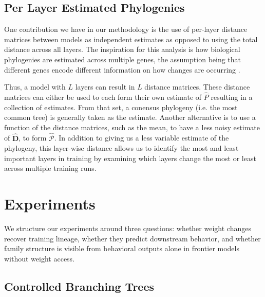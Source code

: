 \documentclass{article}
\begin{document}
\subsection{Per Layer Estimated Phylogenies}
\label{sec:framework:layers}

One contribution we have in our methodology is the use of per-layer distance matrices between models as independent estimates as opposed to using the total distance across all layers.  The inspiration for this analysis is how biological phylogenies are estimated across multiple genes, the assumption being that different genes encode different information on how changes are occurring \cite{}.

Thus, a model with $L$ layers can result in $L$ distance matrices.  These distance matrices can either be used to each form their own estimate of $\hat{P}$ resulting in a collection of estimates.  From that set, a conensus phylogeny (i.e. the most common tree) is generally taken as the estimate.  Another alternative is to use a function of the distance matrices, such as the mean, to have a less noisy estimate of $\hat{\textbf{D}}$, to form $\widehat{\mathcal{P}}$. In addition to giving us a less variable estimate of the phylogeny, this layer-wise distance allows us to identify the most and least important layers in training by examining which layers change the most or least across multiple training runs.



\section{Experiments}
\label{sec:experiments}
We structure our experiments around three questions: whether weight changes
recover training lineage, whether they predict downstream behavior, and
whether family structure is visible from behavioral outputs alone in
frontier models without weight access.

\subsection{Controlled Branching Trees}
\label{sec:exp:trees}
\end{document}
